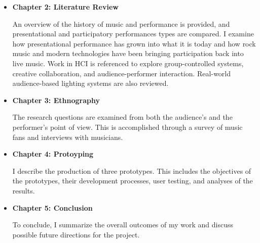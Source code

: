 \begin{itemize}
	\item \textbf{Chapter 2: Literature Review}
	
	An overview of the history of music and performance is provided, and presentational and participatory performances types are compared. I examine how presentational performance has grown into what it is today and how rock music and modern technologies have been bringing participation back into live music. Work in HCI is referenced to explore group-controlled systems, creative collaboration, and audience-performer interaction. Real-world audience-based lighting systems are also reviewed.
			
	\item \textbf{Chapter 3: Ethnography}
	
	The research questions are examined from both the audience's and the performer's point of view. This is accomplished through a survey of music fans and interviews with musicians.
	
	\item \textbf{Chapter 4: Protoyping}
	
	I describe the production of three prototypes. This includes the objectives of the prototypes, their development processes, user testing, and analyses of the results.
		
	\item \textbf{Chapter 5: Conclusion}
	
	To conclude, I summarize the overall outcomes of my work and discuss possible future directions for the project.
\end{itemize}
